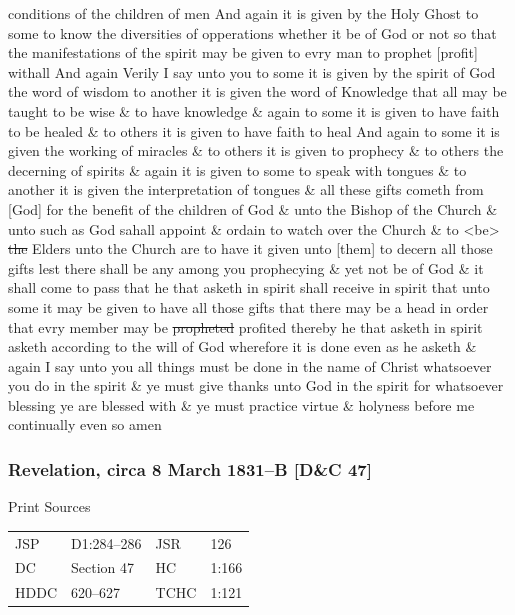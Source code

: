 conditions of the children of men And again it is given by the Holy Ghost to some to know the diversities of opperations whether it be of God or not so that the manifestations of the spirit may be given to evry man to prophet [profit] withall And again Verily I say unto you to some it is given by the spirit of God the word of wisdom to another it is given the word of Knowledge that all may be taught to be wise \& to have knowledge \& again to some it is given to have faith to be healed \& to others it is given to have faith to heal And again to some it is given the working of miracles \& to others it is given to prophecy \& to others the decerning of spirits \& again it is given to some to speak with tongues \& to another it is given the interpretation of tongues \& all these gifts cometh from [God] for the benefit of the children of God \& unto the Bishop of the Church \& unto such as God sahall appoint \& ordain to watch over the Church \& to <be> \sout{the} Elders unto the Church are to have it given unto [them] to decern all those gifts lest there shall be any among you prophecying \& yet not be of God \& it shall come to pass that he that asketh in spirit shall receive in spirit that unto some it may be given to have all those gifts that there may be a head in order that evry member may be \sout{propheted} profited thereby he that asketh in spirit asketh according to the will of God wherefore it is done even as he asketh \& again I say unto you all things must be done in the name of Christ whatsoever you do in the spirit \& ye must give thanks unto God in the spirit for whatsoever blessing ye are blessed with \& ye must practice virtue \& holyness before me continually even so amen
				
		\subsubsection{Revelation, circa 8 March 1831--B [D\&C 47]}
			\label{EMS-1831-JS-CIR-8-MAR-1831-B}
		
			\begin{description}
				\item[Print Sources]
			\end{description}

				\begin{tabular}{p{0.5in}p{1in}p{0.5in}p{1in}}
				JSP	 	& D1:284--286	& JSR 		& 126 \\
				DC	 	& Section 47 	& HC 		& 1:166 \\
				HDDC 	& 620--627		& TCHC 		& 1:121 \\
				\end{tabular}
			
